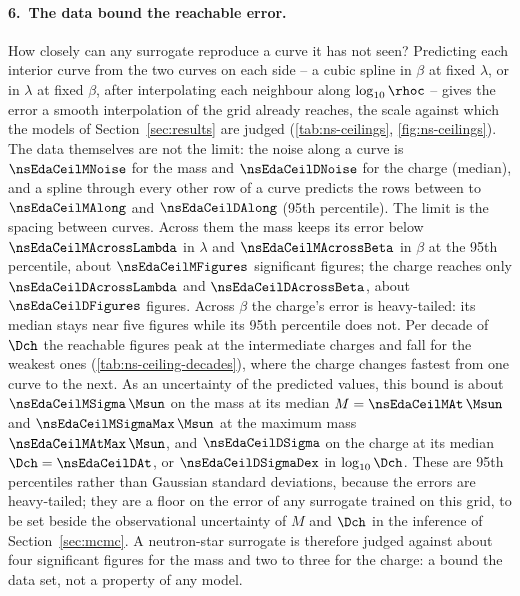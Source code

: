 \FloatBarrier

\paragraph{6.\ The data bound the reachable error.}
How closely can any surrogate reproduce a curve it has not seen? Predicting each interior curve from the two curves on each side -- a cubic spline in $\beta$ at fixed $\lambda$, or in $\lambda$ at fixed $\beta$, after interpolating each neighbour along $\log_{10}\rhoc$ -- gives the error a smooth interpolation of the grid already reaches, the scale against which the models of Section~\ref{sec:results} are judged (\cref{tab:ns-ceilings}, \cref{fig:ns-ceilings}). The data themselves are not the limit: the noise along a curve is $\nsEdaCeilMNoise$ for the mass and $\nsEdaCeilDNoise$ for the charge (median), and a spline through every other row of a curve predicts the rows between to $\nsEdaCeilMAlong$ and $\nsEdaCeilDAlong$ (95th percentile). The limit is the spacing between curves. Across them the mass keeps its error below $\nsEdaCeilMAcrossLambda$ in $\lambda$ and $\nsEdaCeilMAcrossBeta$ in $\beta$ at the 95th percentile, about $\nsEdaCeilMFigures$ significant figures; the charge reaches only $\nsEdaCeilDAcrossLambda$ and $\nsEdaCeilDAcrossBeta$, about $\nsEdaCeilDFigures$ figures. Across $\beta$ the charge's error is heavy-tailed: its median stays near five figures while its 95th percentile does not. Per decade of $\Dch$ the reachable figures peak at the intermediate charges and fall for the weakest ones (\cref{tab:ns-ceiling-decades}), where the charge changes fastest from one curve to the next.
As an uncertainty of the predicted values, this bound is about $\nsEdaCeilMSigma\,\Msun$ on the mass at its median $M = \nsEdaCeilMAt\,\Msun$ and $\nsEdaCeilMSigmaMax\,\Msun$ at the maximum mass $\nsEdaCeilMAtMax\,\Msun$, and $\nsEdaCeilDSigma$ on the charge at its median $\Dch = \nsEdaCeilDAt$, or $\nsEdaCeilDSigmaDex$ in $\log_{10}\Dch$. These are 95th percentiles rather than Gaussian standard deviations, because the errors are heavy-tailed; they are a floor on the error of any surrogate trained on this grid, to be set beside the observational uncertainty of $M$ and $\Dch$ in the inference of Section~\ref{sec:mcmc}.
A neutron-star surrogate is therefore judged against about four significant figures for the mass and two to three for the charge: a bound the data set, not a property of any model.

\FloatBarrier
